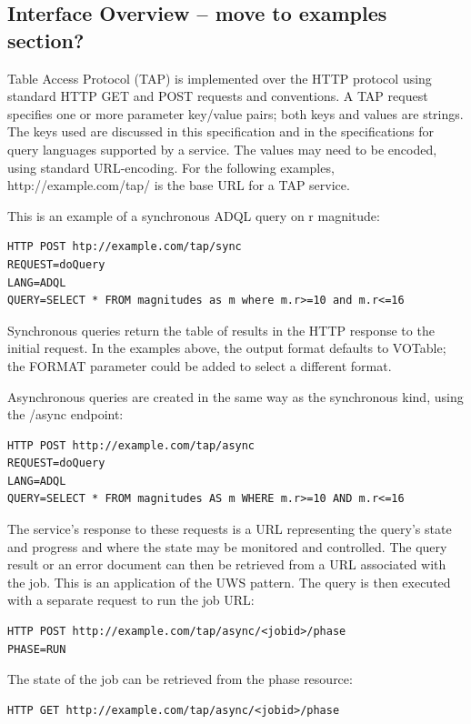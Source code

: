 \documentclass[11pt,letter]{ivoa}
\begin{document}
\subsection{Interface Overview -- move to examples section?}
Table Access Protocol (TAP) is implemented over the HTTP protocol using standard 
HTTP GET and POST requests and conventions. A TAP request specifies one or more 
parameter key/value pairs; both keys and values are strings. The keys used are 
discussed in this specification and in the specifications for query languages 
supported by a service. The values may need to be encoded, using standard 
URL-encoding. For the following examples, http://example.com/tap/ is the base 
URL for a TAP service.

This is an example of a synchronous ADQL query on r magnitude:

\begin{verbatim}
HTTP POST htp://example.com/tap/sync
REQUEST=doQuery
LANG=ADQL
QUERY=SELECT * FROM magnitudes as m where m.r>=10 and m.r<=16
\end{verbatim}

Synchronous queries return the table of results in the HTTP response to the 
initial request. In the examples above, the output format defaults to VOTable; 
the FORMAT parameter could be added to select a different format.

Asynchronous queries are created in the same way as the synchronous kind, using 
the /async endpoint:

\begin{verbatim}
HTTP POST http://example.com/tap/async
REQUEST=doQuery
LANG=ADQL
QUERY=SELECT * FROM magnitudes AS m WHERE m.r>=10 AND m.r<=16
\end{verbatim}

The service's response to these requests is a URL representing the query's 
state and progress and where the state may be monitored and controlled. The 
query 
result or an error document can then be retrieved from a URL associated with the 
job. This is an application of the UWS pattern. The query is then executed 
with a separate request to run the job URL:

\begin{verbatim}
HTTP POST http://example.com/tap/async/<jobid>/phase
PHASE=RUN
\end{verbatim}

The state of the job can be retrieved from the phase resource:

\begin{verbatim}
HTTP GET http://example.com/tap/async/<jobid>/phase
\end{verbatim}
\end{document}
